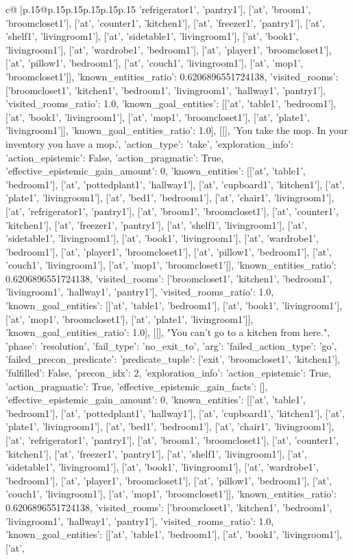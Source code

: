 \documentclass{article}
\begin{document}
{\begin{supertabular}{c@{$\;$}|p{.15\linewidth}@{}p{.15\linewidth}p{.15\linewidth}p{.15\linewidth}p{.15\linewidth}p{.15\linewidth}}
{{{'refrigerator1', 'pantry1'], ['at', 'broom1', 'broomcloset1'], ['at', 'counter1', 'kitchen1'], ['at', 'freezer1', 'pantry1'], ['at', 'shelf1', 'livingroom1'], ['at', 'sidetable1', 'livingroom1'], ['at', 'book1', 'livingroom1'], ['at', 'wardrobe1', 'bedroom1'], ['at', 'player1', 'broomcloset1'], ['at', 'pillow1', 'bedroom1'], ['at', 'couch1', 'livingroom1'], ['at', 'mop1', 'broomcloset1']], 'known_entities_ratio': 0.6206896551724138, 'visited_rooms': ['broomcloset1', 'kitchen1', 'bedroom1', 'livingroom1', 'hallway1', 'pantry1'], 'visited_rooms_ratio': 1.0, 'known_goal_entities': [['at', 'table1', 'bedroom1'], ['at', 'book1', 'livingroom1'], ['at', 'mop1', 'broomcloset1'], ['at', 'plate1', 'livingroom1']], 'known_goal_entities_ratio': 1.0}}], [[], 'You take the mop. In your inventory you have a mop.', {'action_type': 'take', 'exploration_info': {'action_epistemic': False, 'action_pragmatic': True, 'effective_epistemic_gain_amount': 0, 'known_entities': [['at', 'table1', 'bedroom1'], ['at', 'pottedplant1', 'hallway1'], ['at', 'cupboard1', 'kitchen1'], ['at', 'plate1', 'livingroom1'], ['at', 'bed1', 'bedroom1'], ['at', 'chair1', 'livingroom1'], ['at', 'refrigerator1', 'pantry1'], ['at', 'broom1', 'broomcloset1'], ['at', 'counter1', 'kitchen1'], ['at', 'freezer1', 'pantry1'], ['at', 'shelf1', 'livingroom1'], ['at', 'sidetable1', 'livingroom1'], ['at', 'book1', 'livingroom1'], ['at', 'wardrobe1', 'bedroom1'], ['at', 'player1', 'broomcloset1'], ['at', 'pillow1', 'bedroom1'], ['at', 'couch1', 'livingroom1'], ['at', 'mop1', 'broomcloset1']], 'known_entities_ratio': 0.6206896551724138, 'visited_rooms': ['broomcloset1', 'kitchen1', 'bedroom1', 'livingroom1', 'hallway1', 'pantry1'], 'visited_rooms_ratio': 1.0, 'known_goal_entities': [['at', 'table1', 'bedroom1'], ['at', 'book1', 'livingroom1'], ['at', 'mop1', 'broomcloset1'], ['at', 'plate1', 'livingroom1']], 'known_goal_entities_ratio': 1.0}}], [[], "You can't go to a kitchen from here.", {'phase': 'resolution', 'fail_type': 'no_exit_to', 'arg': {'failed_action_type': 'go', 'failed_precon_predicate': {'predicate_tuple': ['exit', 'broomcloset1', 'kitchen1'], 'fulfilled': False, 'precon_idx': 2}}, 'exploration_info': {'action_epistemic': True, 'action_pragmatic': True, 'effective_epistemic_gain_facts': [], 'effective_epistemic_gain_amount': 0, 'known_entities': [['at', 'table1', 'bedroom1'], ['at', 'pottedplant1', 'hallway1'], ['at', 'cupboard1', 'kitchen1'], ['at', 'plate1', 'livingroom1'], ['at', 'bed1', 'bedroom1'], ['at', 'chair1', 'livingroom1'], ['at', 'refrigerator1', 'pantry1'], ['at', 'broom1', 'broomcloset1'], ['at', 'counter1', 'kitchen1'], ['at', 'freezer1', 'pantry1'], ['at', 'shelf1', 'livingroom1'], ['at', 'sidetable1', 'livingroom1'], ['at', 'book1', 'livingroom1'], ['at', 'wardrobe1', 'bedroom1'], ['at', 'player1', 'broomcloset1'], ['at', 'pillow1', 'bedroom1'], ['at', 'couch1', 'livingroom1'], ['at', 'mop1', 'broomcloset1']], 'known_entities_ratio': 0.6206896551724138, 'visited_rooms': ['broomcloset1', 'kitchen1', 'bedroom1', 'livingroom1', 'hallway1', 'pantry1'], 'visited_rooms_ratio': 1.0, 'known_goal_entities': [['at', 'table1', 'bedroom1'], ['at', 'book1', 'livingroom1'], ['at', }}}
\end{supertabular}}
\end{document}

